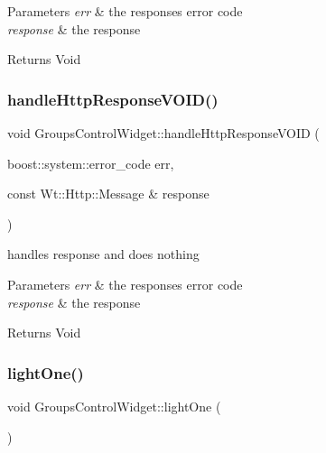 \begin{DoxyParams}{Parameters}
{\em err} & the response\textquotesingle{}s error code \\
\hline
{\em response} & the response \\
\hline
\end{DoxyParams}
\begin{DoxyReturn}{Returns}
Void 
\end{DoxyReturn}
\mbox{\label{class_groups_control_widget_ade80d514e591c307c4cc6c0fbb758896}} 
\subsubsection{\texorpdfstring{handle\+Http\+Response\+V\+O\+I\+D()}{handleHttpResponseVOID()}}
{\footnotesize\ttfamily void Groups\+Control\+Widget\+::handle\+Http\+Response\+V\+O\+ID (\begin{DoxyParamCaption}\item[{boost\+::system\+::error\+\_\+code}]{err,  }\item[{const Wt\+::\+Http\+::\+Message \&}]{response }\end{DoxyParamCaption})\hspace{0.3cm}{\ttfamily [private]}}



handles response and does nothing 


\begin{DoxyParams}{Parameters}
{\em err} & the response\textquotesingle{}s error code \\
\hline
{\em response} & the response \\
\hline
\end{DoxyParams}
\begin{DoxyReturn}{Returns}
Void 
\end{DoxyReturn}
\mbox{\label{class_groups_control_widget_a801b235a88f796198f1a65fcbe13c725}} 
\subsubsection{\texorpdfstring{light\+One()}{lightOne()}}
{\footnotesize\ttfamily void Groups\+Control\+Widget\+::light\+One (\begin{DoxyParamCaption}{ }\end{DoxyParamCaption})\hspace{0.3cm}{\ttfamily [private]}}



